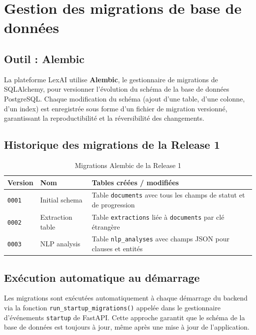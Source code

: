 \section{Gestion des migrations de base de données}

\subsection{Outil : Alembic}

La plateforme LexAI utilise \textbf{Alembic}, le gestionnaire de migrations de SQLAlchemy, pour versionner l'évolution du schéma de la base de données PostgreSQL. Chaque modification du schéma (ajout d'une table, d'une colonne, d'un index) est enregistrée sous forme d'un fichier de migration versionné, garantissant la reproductibilité et la réversibilité des changements.

\subsection{Historique des migrations de la Release 1}

\begin{table}[H]
\centering
\renewcommand{\arraystretch}{1.4}
\begin{tabular}{|p{3cm}|p{4cm}|p{7cm}|}
\hline
\textbf{Version} & \textbf{Nom} & \textbf{Tables créées / modifiées} \\
\hline
\texttt{0001} & Initial schema & Table \texttt{documents} avec tous les champs de statut et de progression \\
\hline
\texttt{0002} & Extraction table & Table \texttt{extractions} liée à \texttt{documents} par clé étrangère \\
\hline
\texttt{0003} & NLP analysis & Table \texttt{nlp\_analyses} avec champs JSON pour clauses et entités \\
\hline
\end{tabular}
\caption{Migrations Alembic de la Release 1}
\label{tab:migrations_r1}
\end{table}

\subsection{Exécution automatique au démarrage}

Les migrations sont exécutées automatiquement à chaque démarrage du backend via la fonction \texttt{run\_startup\_migrations()} appelée dans le gestionnaire d'événements \texttt{startup} de FastAPI. Cette approche garantit que le schéma de la base de données est toujours à jour, même après une mise à jour de l'application.

